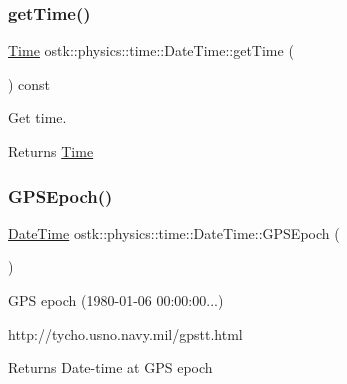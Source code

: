 \subsubsection{\texorpdfstring{get\+Time()}{getTime()}}
{\footnotesize\ttfamily \hyperlink{classostk_1_1physics_1_1time_1_1_time}{Time} ostk\+::physics\+::time\+::\+Date\+Time\+::get\+Time (\begin{DoxyParamCaption}{ }\end{DoxyParamCaption}) const}



Get time. 

\begin{DoxyReturn}{Returns}
\hyperlink{classostk_1_1physics_1_1time_1_1_time}{Time} 
\end{DoxyReturn}
\mbox{\label{classostk_1_1physics_1_1time_1_1_date_time_a034452967c2b5a89368d33a61dec2606}} 
\subsubsection{\texorpdfstring{G\+P\+S\+Epoch()}{GPSEpoch()}}
{\footnotesize\ttfamily \hyperlink{classostk_1_1physics_1_1time_1_1_date_time}{Date\+Time} ostk\+::physics\+::time\+::\+Date\+Time\+::\+G\+P\+S\+Epoch (\begin{DoxyParamCaption}{ }\end{DoxyParamCaption})\hspace{0.3cm}{\ttfamily [static]}}



G\+PS epoch (1980-\/01-\/06 00\+:00\+:00...) 

http\+://tycho.usno.\+navy.\+mil/gpstt.html

\begin{DoxyReturn}{Returns}
Date-\/time at G\+PS epoch 
\end{DoxyReturn}
\mbox{\label{classostk_1_1physics_1_1time_1_1_date_time_a2fd2deab390516483e1757c45ae81282}} 
